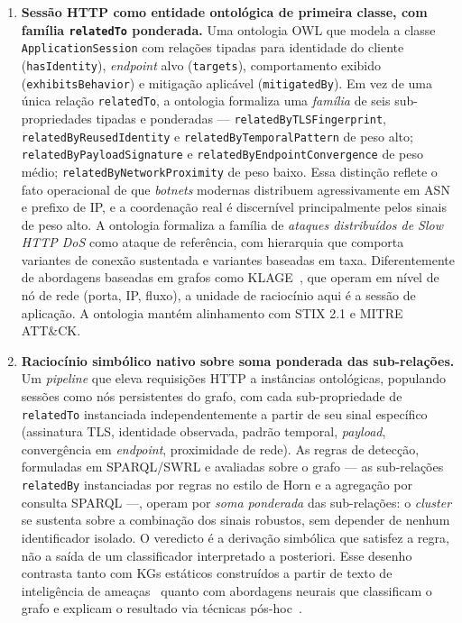 \documentclass[preprint,12pt]{elsarticle}
\begin{document}
\begin{enumerate}
    \item \textbf{Sessão HTTP como entidade ontológica de primeira classe, com família \texttt{relatedTo} ponderada.} Uma ontologia OWL que modela a classe \texttt{ApplicationSession} com relações tipadas para identidade do cliente (\texttt{hasIdentity}), \emph{endpoint} alvo (\texttt{targets}), comportamento exibido (\texttt{exhibitsBehavior}) e mitigação aplicável (\texttt{mitigatedBy}). Em vez de uma única relação \texttt{relatedTo}, a ontologia formaliza uma \emph{família} de seis sub-propriedades tipadas e ponderadas --- \texttt{relatedByTLSFingerprint}, \texttt{relatedByReusedIdentity} e \texttt{relatedByTemporalPattern} de peso alto; \texttt{relatedByPayloadSignature} e \texttt{relatedByEndpointConvergence} de peso médio; \texttt{relatedByNetworkProximity} de peso baixo. Essa distinção reflete o fato operacional de que \emph{botnets} modernas distribuem agressivamente em ASN e prefixo de IP, e a coordenação real é discernível principalmente pelos sinais de peso alto. A ontologia formaliza a família de \emph{ataques distribuídos de Slow HTTP DoS} como ataque de referência, com hierarquia que comporta variantes de conexão sustentada e variantes baseadas em taxa. Diferentemente de abordagens baseadas em grafos como KLAGE~\cite{belcastro2025klage}, que operam em nível de nó de rede (porta, IP, fluxo), a unidade de raciocínio aqui é a sessão de aplicação. A ontologia mantém alinhamento com STIX 2.1 e MITRE ATT\&CK.

    \item \textbf{Raciocínio simbólico nativo sobre soma ponderada das sub-relações.} Um \emph{pipeline} que eleva requisições HTTP a instâncias ontológicas, populando sessões como nós persistentes do grafo, com cada sub-propriedade de \texttt{relatedTo} instanciada independentemente a partir de seu sinal específico (assinatura TLS, identidade observada, padrão temporal, \emph{payload}, convergência em \emph{endpoint}, proximidade de rede). As regras de detecção, formuladas em SPARQL/SWRL e avaliadas sobre o grafo --- as sub-relações \texttt{relatedBy} instanciadas por regras no estilo de Horn e a agregação por consulta SPARQL ---, operam por \emph{soma ponderada} das sub-relações: o \emph{cluster} se sustenta sobre a combinação dos sinais robustos, sem depender de nenhum identificador isolado. O veredicto é a derivação simbólica que satisfez a regra, não a saída de um classificador interpretado a posteriori. Esse desenho contrasta tanto com KGs estáticos construídos a partir de texto de inteligência de ameaças~\cite{jia2018practical,bonagiri2024practical} quanto com abordagens neurais que classificam o grafo e explicam o resultado via técnicas pós-hoc~\cite{belcastro2025klage}.


\end{enumerate}
\end{document}
